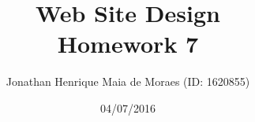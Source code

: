 \title{Web Site Design \\ Homework 7}
\author{Jonathan Henrique Maia de Moraes (ID: 1620855)}
\date{04/07/2016}
\maketitle

